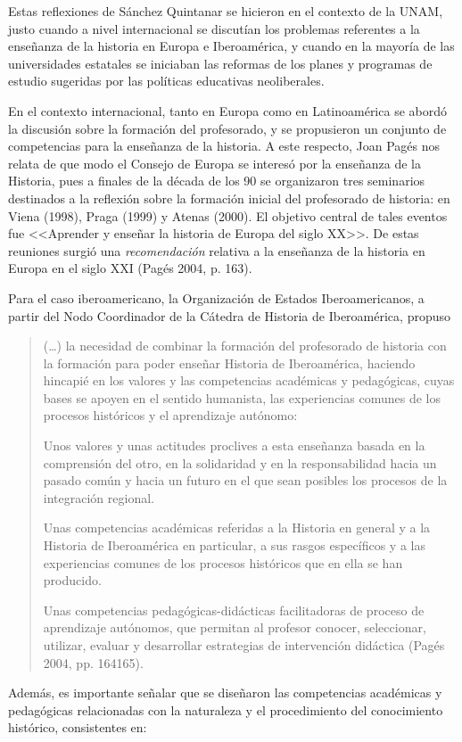 Estas reflexiones de Sánchez Quintanar se hicieron en el contexto de la UNAM,
justo cuando a nivel internacional se discutían los problemas referentes a
la enseñanza de la historia en Europa e Iberoamérica, y cuando en la
mayoría de las universidades estatales se iniciaban las reformas de los planes y programas 
 de estudio sugeridas por las políticas educativas neoliberales.

En el contexto internacional, tanto en Europa como  en Latinoamérica se
abordó la discusión sobre la formación del profesorado, y se propusieron un conjunto de
competencias para la enseñanza de la historia. A este respecto, Joan Pagés nos relata de que modo el Consejo de Europa se interesó por la enseñanza de la Historia, pues a finales de la década de los 90 se organizaron tres seminarios destinados a la reflexión sobre la formación inicial del profesorado de historia: en Viena (1998), Praga (1999) y Atenas
(2000). El objetivo central de tales eventos fue <<Aprender y enseñar la historia de Europa del siglo XX>>. 
De estas reuniones surgió una \textit{recomendación} relativa a la enseñanza de la historia en Europa en el siglo XXI (Pagés 2004, p. 163).

Para el caso iberoamericano, la Organización de Estados Iberoamericanos, a partir del Nodo Coordinador de la Cátedra de Historia de Iberoamérica, propuso 

\begin{quotation}
(\ldots) la necesidad de combinar la formación del profesorado de
historia con la formación para poder enseñar Historia de Iberoamérica,
haciendo hincapié en los valores y las competencias académicas y pedagógicas,
cuyas bases se apoyen en el sentido humanista, las experiencias comunes de los procesos históricos y el aprendizaje autónomo:

Unos valores y unas actitudes proclives a esta enseñanza basada en la
comprensión del otro, en la solidaridad y en la responsabilidad hacia un
pasado común y hacia un futuro en el que sean posibles los procesos de la
integración regional.

Unas competencias académicas referidas a la Historia en general y a la
Historia de Iberoamérica en particular, a sus rasgos específicos y a las
experiencias comunes de los procesos históricos que en ella se han
producido.

Unas competencias pedagógicas-didácticas facilitadoras de proceso de
aprendizaje autónomos, que permitan al profesor conocer, seleccionar,
utilizar, evaluar y desarrollar estrategias de intervención didáctica
(Pagés 2004, pp. 164\textendash{}165).
\end{quotation}
\enlargethispage{1\baselineskip}
Además, es importante señalar que se diseñaron las competencias académicas y
pedagógicas relacionadas con la naturaleza y el procedimiento del conocimiento histórico, consistentes en:

